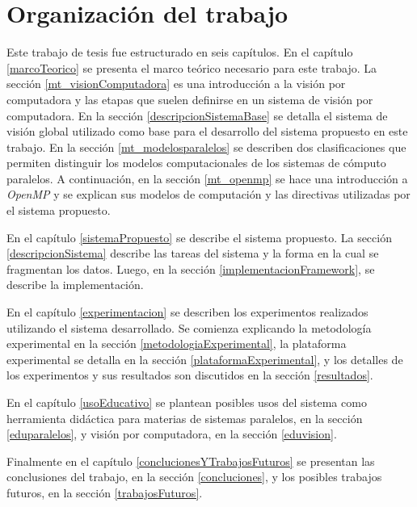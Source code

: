 
\section{Organización del trabajo}

Este trabajo de tesis fue estructurado en seis capítulos. En el capítulo
\ref{marcoTeorico} se presenta el marco teórico necesario para este trabajo. La
sección \ref{mt_visionComputadora} es una introducción a la visión por
computadora y las etapas que suelen definirse en un sistema de visión por
computadora. En la sección \ref{descripcionSistemaBase} se detalla el sistema de
visión global utilizado como base para el desarrollo del sistema propuesto en
este trabajo.  En la sección \ref{mt_modelosparalelos} se describen dos
clasificaciones que permiten distinguir los modelos computacionales de los
sistemas de cómputo paralelos. A continuación, en la sección \ref{mt_openmp} se
hace una introducción a \emph{OpenMP} y se explican sus modelos de computación y
las directivas utilizadas por el sistema propuesto.

En el capítulo \ref{sistemaPropuesto} se describe el sistema propuesto. La
sección \ref{descripcionSistema} describe las tareas del sistema y la forma en
la cual se fragmentan los datos. Luego, en la sección
\ref{implementacionFramework}, se describe la implementación.

En el capítulo \ref{experimentacion} se describen los experimentos realizados
utilizando el sistema desarrollado. Se comienza explicando la metodología
experimental en la sección \ref{metodologiaExperimental}, la plataforma
experimental se detalla en la sección \ref{plataformaExperimental}, y los
detalles de los experimentos y sus resultados son discutidos en la sección
\ref{resultados}.

En el capítulo \ref{usoEducativo} se plantean posibles usos del sistema como
herramienta didáctica para materias de sistemas paralelos, en la sección
\ref{eduparalelos}, y visión por computadora, en la sección \ref{eduvision}.

Finalmente en el capítulo \ref{conclucionesYTrabajosFuturos} se presentan las
conclusiones del trabajo, en la sección \ref{concluciones}, y los posibles
trabajos futuros, en la sección \ref{trabajosFuturos}.
